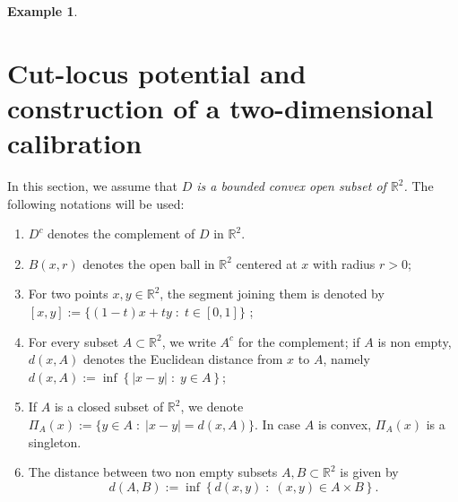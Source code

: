 \documentclass[reqno,11pt]{amsart}
\theoremstyle{definition}
\newtheorem{example}[theorem]{Example}
\numberwithin{equation}{section}
\newcommand{\RR}{\mathbb{R}}
\def\R{\mathbb{R}}
\newcommand{\1}{{{\bf 1}\kern-0,28em\rm l}}
\def\sepa{\; : \;}
\newcommand{\aco}[1]{\left\{#1\right\}}
\begin{document}
\begin{example}





\end{example}



\medskip

\section{Cut-locus potential and construction of a two-dimensional calibration}
\label{scutlocus}



\bigskip
In this section, we assume that\emph{ $D$ is a bounded convex open subset of $\RR^2$.}
The following  notations will be used:
\begin{enumerate}[leftmargin=6mm]
\item[-] $D^c$ denotes the complement of $D$ in $\R^2$.
\item[-] $B(x,r)$ denotes the open ball in $\RR^2$ centered at $x$ with radius $r>0$;
\item[-]  For two points $x,y\in \RR^2$, the segment joining them is denoted by $[x,y]:= \{ (1-t)x + ty \sepa t\in[0,1] \}$ ;
\item[-] For every  subset $A\subset\RR^2$, we write $A^c$ for the complement; if $A$ is non empty, $d(x,A)$ denotes the Euclidean distance from $x$ to $A$, namely
$d(x,A):= \inf \aco{ |x- y| \sepa y\in A}$; 
\item[-] If $A$ is a closed subset of $\RR^2$, we denote $\Pi_A(x):=\{y\in A \sepa |x-y| =d(x,A)\}$. In case $A$ is convex, $\Pi_A(x)$ is a singleton.

\item[-] The distance between two non empty subsets $A,B\subset \RR^2$ is given by 
$$d(A,B):=\inf \aco{ d(x,y) \sepa (x,y)\in  A\times B } .$$
\end{enumerate}
\end{document}
